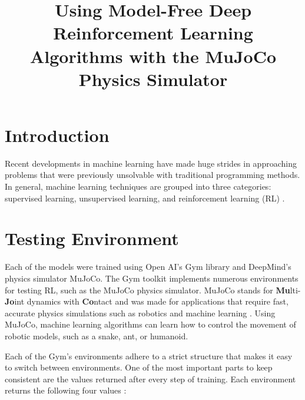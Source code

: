 \documentclass[conference]{IEEEtran}
\begin{document}
\title{Using Model-Free Deep Reinforcement Learning Algorithms with the MuJoCo Physics Simulator}

\author{
    \and
}
\maketitle

\begin{abstract}
    \blindtext
\end{abstract}

\section{Introduction}

Recent developments in machine learning have made huge strides in approaching problems that were previously unsolvable
with traditional programming methods. In general, machine learning techniques are grouped into three categories:
supervised learning, unsupervised learning, and reinforcement learning (RL) \cite{rl_application}.

\blindtext
\blinditemize[4]

\blindtext

\section{Testing Environment}

Each of the models were trained using Open AI's Gym library and DeepMind's physics simulator MuJoCo. The Gym toolkit
implements numerous environments for testing RL, such as the MuJoCo physics simulator. MuJoCo stands
for {\bf Mu}lti-{\bf Jo}int dynamics with {\bf Co}ntact and was made for applications that require fast, accurate
physics simulations such as robotics and machine learning \cite{mujoco_docs}. Using MuJoCo, machine learning
algorithms can learn how to control the movement of robotic models, such as a snake, ant, or humanoid.

Each of the Gym's environments adhere to a strict structure that makes it easy to switch between environments. One of
the most important parts to keep consistent are the values returned after every step of training. Each environment
returns the following four values \cite{gym_docs}:
\end{document}
